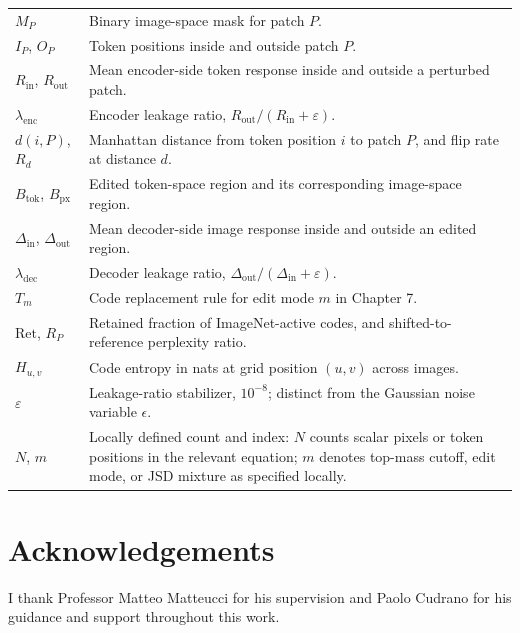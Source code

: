 \documentclass{Configuration_Files/PoliMi3i_thesis}
\begin{document}
\begin{longtable}{p{}p{}}
    $M_P$ & Binary image-space mask for patch $P$. \\[2pt]
    $I_P$, $O_P$ & Token positions inside and outside patch $P$. \\[2pt]
    $R_{\mathrm{in}}$, $R_{\mathrm{out}}$ & Mean encoder-side token response inside and outside a perturbed patch. \\[2pt]
    $\lambda_{\mathrm{enc}}$ & Encoder leakage ratio, $R_{\mathrm{out}}/(R_{\mathrm{in}}+\varepsilon)$. \\[2pt]
    $d(i,P)$, $R_d$ & Manhattan distance from token position $i$ to patch $P$, and flip rate at distance $d$. \\[2pt]
    $B_{\mathrm{tok}}$, $B_{\mathrm{px}}$ & Edited token-space region and its corresponding image-space region. \\[2pt]
    $\Delta_{\mathrm{in}}$, $\Delta_{\mathrm{out}}$ & Mean decoder-side image response inside and outside an edited region. \\[2pt]
    $\lambda_{\mathrm{dec}}$ & Decoder leakage ratio, $\Delta_{\mathrm{out}}/(\Delta_{\mathrm{in}}+\varepsilon)$. \\[2pt]
    $T_m$ & Code replacement rule for edit mode $m$ in Chapter 7. \\[2pt]
    $\mathrm{Ret}$, $R_P$ & Retained fraction of ImageNet-active codes, and shifted-to-reference perplexity ratio. \\[2pt]
    $H_{u,v}$ & Code entropy in nats at grid position $(u,v)$ across images. \\[2pt]
    $\varepsilon$ & Leakage-ratio stabilizer, $10^{-8}$; distinct from the Gaussian noise variable $\epsilon$. \\[2pt]
    $N$, $m$ & Locally defined count and index: $N$ counts scalar pixels or token positions in the relevant equation; $m$ denotes top-mass cutoff, edit mode, or JSD mixture as specified locally. \\[2pt]
\end{longtable}

\chapter*{Acknowledgements}
I thank Professor Matteo Matteucci for his supervision and Paolo Cudrano for
his guidance and support throughout this work.

\cleardoublepage
\end{document}
